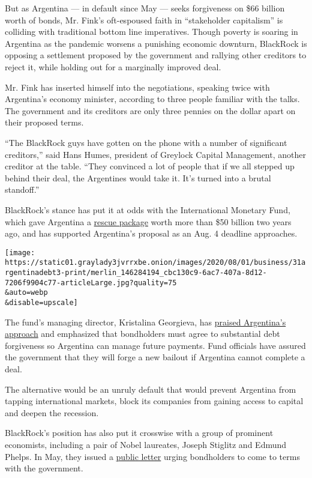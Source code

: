 But as Argentina --- in default since May --- seeks forgiveness on \$66
billion worth of bonds, Mr. Fink's oft-espoused faith in ``stakeholder
capitalism'' is colliding with traditional bottom line imperatives.
Though poverty is soaring in Argentina as the pandemic worsens a
punishing economic downturn, BlackRock is opposing a settlement proposed
by the government and rallying other creditors to reject it, while
holding out for a marginally improved deal.

Mr. Fink has inserted himself into the negotiations, speaking twice with
Argentina's economy minister, according to three people familiar with
the talks. The government and its creditors are only three pennies on
the dollar apart on their proposed terms.

``The BlackRock guys have gotten on the phone with a number of
significant creditors,'' said Hans Humes, president of Greylock Capital
Management, another creditor at the table. ``They convinced a lot of
people that if we all stepped up behind their deal, the Argentines would
take it. It's turned into a brutal standoff.''

BlackRock's stance has put it at odds with the International Monetary
Fund, which gave Argentina a
\href{https://www.nytimes3xbfgragh.onion/2018/06/07/business/argentina-imf-debt.html}{rescue
package} worth more than \$50 billion two years ago, and has supported
Argentina's proposal as an Aug. 4 deadline approaches.

\texttt{[image: https://static01.graylady3jvrrxbe.onion/images/2020/08/01/business/31argentinadebt3-print/merlin\_146284194\_cbc130c9-6ac7-407a-8d12-7206f9904c77-articleLarge.jpg?quality=75\\\&auto=webp\\\&disable=upscale]}

The fund's managing director, Kristalina Georgieva, has
\href{https://www.imf.org/en/News/Articles/2020/02/04/pr2034-statement-by-imf-managing-director-kristalina-georgieva-on-argentina}{praised
Argentina's approach} and emphasized that bondholders must agree to
substantial debt forgiveness so Argentina can manage future payments.
Fund officials have assured the government that they will forge a new
bailout if Argentina cannot complete a deal.

The alternative would be an unruly default that would prevent Argentina
from tapping international markets, block its companies from gaining
access to capital and deepen the recession.

BlackRock's position has also put it crosswise with a group of prominent
economists, including a pair of Nobel laureates, Joseph Stiglitz and
Edmund Phelps. In May, they issued a
\href{https://www.reuters.com/article/us-argentina-bonds-economists/nobelist-stiglitz-economists-from-20-countries-back-argentina-in-debt-showdown-idUSKBN22I2V1?il=0}{public
letter} urging bondholders to come to terms with the government.

